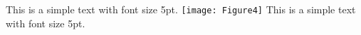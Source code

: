 \documentclass[a4paper]{article}
\begin{document}
    \noindent %
    \thispagestyle{empty} %
    \begin{center} %
        \vspace*{\fill} %
        {\fontsize{5pt}{6pt}\selectfont This is a simple text with font size 5pt.}
        \texttt{[image: Figure4]} %
        \captionsetup{} %
        {\fontsize{5pt}{5pt}\selectfont This is a simple text with font size 5pt.} %
        \vspace*{\fill} %
    \end{center}
\end{document}

